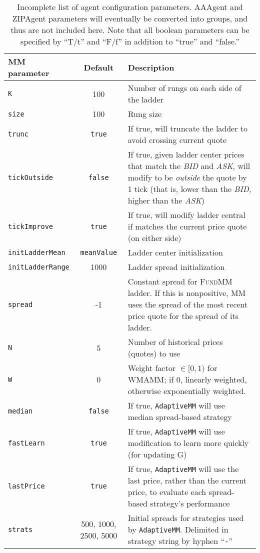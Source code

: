 \documentclass[11pt]{article}
\begin{document}
\begin{table}
\begin{tabulary}{\textwidth}{lcL}
\\ \toprule
\textbf{MM parameter}   & \textbf{Default} & \textbf{Description} \\ \midrule
\texttt{K}			& 100	& Number of rungs on each side of the ladder \\
\texttt{size}			& 100	& Rung size \\
\texttt{trunc}		& \texttt{true} & If true, will truncate the ladder to avoid crossing current quote \\
\texttt{tickOutside}	& \texttt{false} & If true, given ladder center prices that match the \textit{BID} and \textit{ASK}, will modify to be \emph{outside} the quote by 1 tick (that is, lower than the  \textit{BID}, higher than the  \textit{ASK}) \\
\texttt{tickImprove}	& \texttt{true} & If true, will modify ladder central if matches the current price quote (on either side) \\
\texttt{initLadderMean} & \texttt{meanValue} & Ladder center initialization \\
\texttt{initLadderRange} & 1000 & Ladder spread initialization \\

\texttt{spread} & -1 &	 Constant spread for \textsc{FundMM} ladder. If this is nonpositive, MM uses the spread of the most recent price quote for the spread of its ladder. \\
\texttt{N} 	& 5 & Number of historical prices (quotes) to use \\
\texttt{W} 	& 0 & Weight factor $\in [0,1)$ for \textsc{WMAMM}; if 0, linearly weighted, otherwise exponentially weighted. \\

\texttt{median} 	& \texttt{false}	& If true, \texttt{AdaptiveMM} will use median spread-based strategy \\
\texttt{fastLearn}	 & \texttt{true} & If true, \texttt{AdaptiveMM} will use modification to learn more quickly (for updating G) \\
\texttt{lastPrice} & \texttt{true} & If true, \texttt{AdaptiveMM} will use the last price, rather than the current price, to evaluate each spread-based strategy's performance \\
\texttt{strats} 	& 500, 1000, 2500, 5000 & Initial spreads for strategies used by \texttt{AdaptiveMM}. Delimited in strategy string by hyphen ``\texttt{-}'' \\
\bottomrule
\end{tabulary}
\caption{Incomplete list of agent configuration parameters. AAAgent and ZIPAgent parameters will eventually be converted into groups, and thus are not included here. Note that all boolean parameters can be specified by ``T/t'' and ``F/f'' in addition to ``true'' and ``false.''}
\label{tab:ag}
\end{table}
\end{document}
